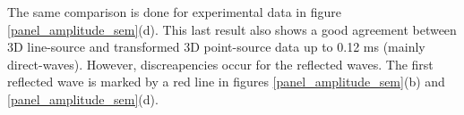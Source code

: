 \documentclass[manuscript,revised]{geophysics}
\newcommand{\twod}{2-D }
\newcommand{\thrd}{3-D }
\begin{document}
\noindent The same comparison is done for experimental data in figure \ref{panel_amplitude_sem}(d). This last result also shows a good agreement between 3D line-source  and transformed 3D point-source data up to 0.12 ms (mainly direct-waves). However, discreapencies occur for the reflected waves. The first reflected wave is marked by a red line in figures \ref{panel_amplitude_sem}(b) and \ref{panel_amplitude_sem}(d).
 
\end{document}
